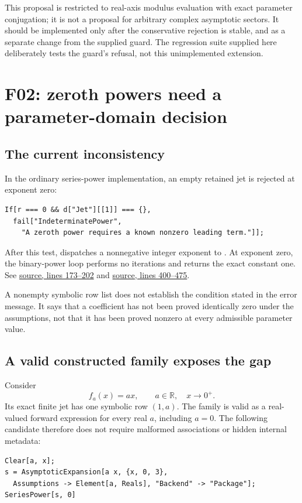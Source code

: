\documentclass[11pt,letterpaper]{article}
\newcommand{\src}[3]{\href{https://github.com/VladimirReshetnikov/Asymptotic/blob/8e859961d7d37f008b826f3a8cad406460271614/#1\#L#2-L#3}{source, lines #2--#3}}
\newcommand{\code}[1]{\texttt{\detokenize{#1}}}
\begin{document}
This proposal is restricted to real-axis modulus evaluation with exact parameter conjugation; it is not a proposal for arbitrary complex asymptotic sectors. It should be implemented only after the conservative rejection is stable, and as a separate change from the supplied guard. The regression suite supplied here deliberately tests the guard's refusal, not this unimplemented extension.

\section{F02: zeroth powers need a parameter-domain decision}\label{sec:F02}

\subsection{The current inconsistency}

In the ordinary series-power implementation, an empty retained jet is rejected at exponent zero:
\begin{lstlisting}
If[r === 0 && d["Jet"][[1]] === {},
  fail["IndeterminatePower",
    "A zeroth power requires a known nonzero leading term."]];
\end{lstlisting}
After this test, \code{fwdPower} dispatches a nonnegative integer exponent to \code{pIntegerPower}. At exponent zero, the binary-power loop performs no iterations and returns the exact constant one.\cite{operations,core} See \src{src/Kernel/SeriesOperations.wl}{173}{202} and \src{src/Kernel/AsymptoticAnalysis.wl}{400}{475}.

A nonempty symbolic row list does not establish the condition stated in the error message. It says that a coefficient has not been proved identically zero under the assumptions, not that it has been proved nonzero at every admissible parameter value.

\subsection{A valid constructed family exposes the gap}

Consider
\begin{equation}\label{eq:zerofamily}
 f_a(x)=a x,\qquad a\in\mathbb R,\quad x\to0^+.
\end{equation}
Its exact finite jet has one symbolic row $(1,a)$. The family is valid as a real-valued forward expression for every real $a$, including $a=0$. The following candidate therefore does not require malformed associations or hidden internal metadata:
\begin{lstlisting}
Clear[a, x];
s = AsymptoticExpansion[a x, {x, 0, 3},
  Assumptions -> Element[a, Reals], "Backend" -> "Package"];
SeriesPower[s, 0]
\end{lstlisting}
\end{document}
